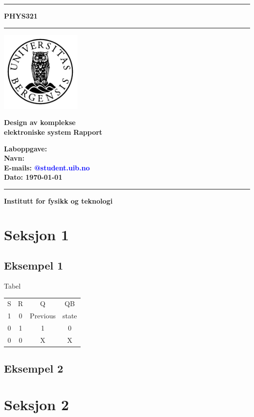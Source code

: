 \documentclass[12pt]{article}
\renewcommand{\maketitle}{}
\begin{document}
\maketitle
\newcommand{\blankpage}{\newpage{}\thispagestyle{empty}\mbox{}\newpage{}}
\newcommand{\HRule}{\rule{\linewidth}{0.5mm}}

\begin{titlepage}

\hrule height 0.1cm
\vskip 1cm 
\textbf{\fontsize{40}{48} \selectfont PHYS321}
\vskip 1cm 
\hrule height 0.1cm
\hfill\includegraphics[width=4cm]{uib-emblem-svart} 

\textbf {\fontsize{40}{48} \selectfont  Design av komplekse \\elektroniske system }\vskip 1cm 
\centering 
\textbf  {\fontsize{20}{24} \selectfont Rapport }\vskip 1cm
\justify
    
\textbf
{Laboppgave:  
\\Navn:   
\\ E-mails: \textcolor{blue}{@student.uib.no}
\\ Dato:   {\today}
}
\vskip 4cm 

\hrule height 0.1cm
\vskip 0.3cm 
\textbf {\large Institutt for fysikk og teknologi}

\end{titlepage}




\setlength{\parskip}{0.2in}

\section{Seksjon 1 }
\subsection{Eksempel 1}
Tabel
 \begin{table}[h!]
   \begin{tabular}{cccc}
    S & R & Q        & QB    \\
    1 & 0 & Previous & state \\
    0 & 1 & 1        & 0     \\
    0 & 0 & X        & X    
  \end{tabular}
 \end{table}
 

 
\subsection{Eksempel 2}


\section{Seksjon 2}


\clearpage


\end{document}
